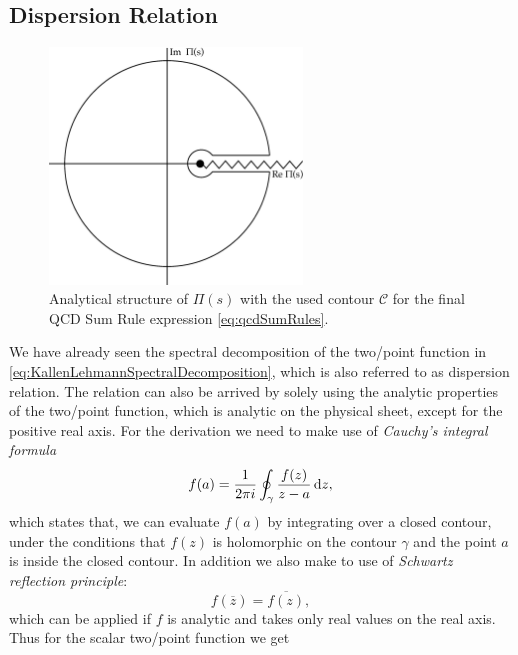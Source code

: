 \documentclass[../../index.tex]{subfiles}
\begin{document}
\subsection{Dispersion Relation}
\begin{figure}
  \centering
  \label{fig:correlatorComplexContour}
  \includegraphics[width=0.6\textwidth]{./images/correlatorComplexContour.eps}
  \caption{Analytical structure of $\Pi(s)$ with the used contour $\mathcal{C}$
    for the final QCD Sum Rule expression \cref{eq:qcdSumRules}.}
\end{figure}
We have already seen the spectral decomposition of the two\-/point function in
\cref{eq:KallenLehmannSpectralDecomposition}, which is also referred to as
dispersion relation. The relation can also be arrived by solely using the
analytic properties of the two\-/point function, which is analytic on the
physical sheet, except for the positive real axis. For the derivation we need to
make use of \textit{Cauchy's integral formula}
\begin{equation}
  f(a) = \frac{1}{2\pi i} \oint_\gamma \frac{f(z)}{z-a}\dif z,
\end{equation}
which states that, we can evaluate \(f(a)\) by integrating over a closed
contour, under the conditions that \(f(z)\) is holomorphic on the contour
\(\gamma\) and the point \(a\) is inside the closed contour. In addition we also
make to use of \textit{Schwartz reflection principle}:
\begin{equation}
  f(\overline{z}) = \overline{f(z)},
\end{equation}
which can be applied if \(f\) is analytic and takes only real values on the real
axis. Thus for the scalar two\-/point function we get
\end{document}
